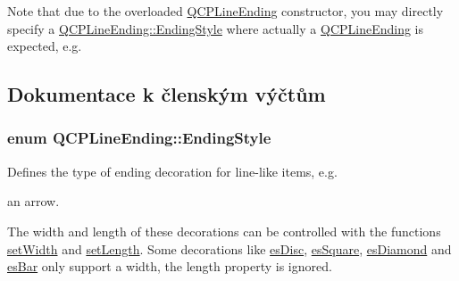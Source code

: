 Note that due to the overloaded \hyperlink{classQCPLineEnding}{Q\+C\+P\+Line\+Ending} constructor, you may directly specify a \hyperlink{classQCPLineEnding_a5ef16e6876b4b74959c7261d8d4c2cd5}{Q\+C\+P\+Line\+Ending\+::\+Ending\+Style} where actually a \hyperlink{classQCPLineEnding}{Q\+C\+P\+Line\+Ending} is expected, e.\+g. 
\begin{DoxyCodeInclude}
\end{DoxyCodeInclude}


\subsection{Dokumentace k členským výčtům}
\hypertarget{classQCPLineEnding_a5ef16e6876b4b74959c7261d8d4c2cd5}{}
\subsubsection[{Ending\+Style}]{\setlength{\rightskip}{0pt plus 5cm}enum {\bf Q\+C\+P\+Line\+Ending\+::\+Ending\+Style}}\label{classQCPLineEnding_a5ef16e6876b4b74959c7261d8d4c2cd5}


Defines the type of ending decoration for line-\/like items, e.\+g. 

an arrow.



The width and length of these decorations can be controlled with the functions \hyperlink{classQCPLineEnding_a26dc020ea985a72cc25881ce2115e34e}{set\+Width} and \hyperlink{classQCPLineEnding_ae36fa01763751cd64b7f56c3507e935a}{set\+Length}. Some decorations like \hyperlink{classQCPLineEnding_a5ef16e6876b4b74959c7261d8d4c2cd5ae5a3414916817258bcc6dddd605e8f5c}{es\+Disc}, \hyperlink{classQCPLineEnding_a5ef16e6876b4b74959c7261d8d4c2cd5ae1836502fa43d8990bb62b2d493a140a}{es\+Square}, \hyperlink{classQCPLineEnding_a5ef16e6876b4b74959c7261d8d4c2cd5a378fe5a8b768411b0bc1765210fe7200}{es\+Diamond} and \hyperlink{classQCPLineEnding_a5ef16e6876b4b74959c7261d8d4c2cd5a2cf543bbca332df26d89bf779f50469f}{es\+Bar} only support a width, the length property is ignored.

